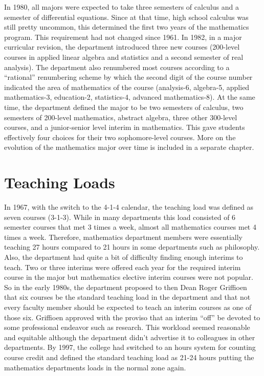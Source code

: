 \documentclass[
]{book}
\begin{document}
In 1980, all majors were expected to take three semesters of calculus and a semester of differential equations. Since at that time, high school calculus was still pretty uncommon, this determined the first two years of the mathematics program. This requirement had not changed since 1961. In 1982, in a major curricular revision, the department introduced three new courses (200-level courses in applied linear algebra and statistics and a second semester of real analysis). The department also renumbered most courses according to a ``rational'' renumbering scheme by which the second digit of the course number indicated the area of mathematics of the course (analysis-6, algebra-5, applied mathematics-3, education-2, statistics-4, advanced mathematics-8). At the same time, the department defined the major to be two semesters of calculus, two semesters of 200-level mathematics, abstract algebra, three other 300-level courses, and a junior-senior level interim in mathematics. This gave students effectively four choices for their two sophomore-level courses. More on the evolution of the mathematics major over time is included in a separate chapter.

\hypertarget{teaching-loads}{%
\section{Teaching Loads}\label{teaching-loads}}

In 1967, with the switch to the 4-1-4 calendar, the teaching load was defined as seven courses (3-1-3). While in many departments this load consisted of 6 semester courses that met 3 times a week, almost all mathematics courses met 4 times a week. Therefore, mathematics department members were essentially teaching 27 hours compared to 21 hours in some departments such as philosophy. Also, the department had quite a bit of difficulty finding enough interims to teach. Two or three interims were offered each year for the required interim course in the major but mathematics elective interim courses were not popular. So in the early 1980s, the department proposed to then Dean Roger Griffioen that six courses be the standard teaching load in the department and that not every faculty member should be expected to teach an interim courses as one of those six. Griffioen approved with the proviso that an interim ``off'' be devoted to some professional endeavor such as research. This workload seemed reasonable and equitable although the department didn't advertise it to colleagues in other departments. By 1997, the college had switched to an hours system for counting course credit and defined the standard teaching load as 21-24 hours putting the mathematics departments loads in the normal zone again.
\end{document}
